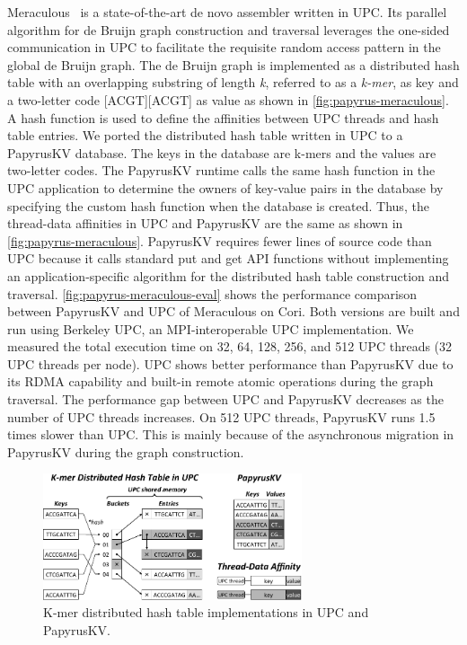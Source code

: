 Meraculous~\cite{Georganas:2014:PDB} is a state-of-the-art de novo assembler written in UPC. Its parallel algorithm for de Bruijn graph construction and traversal leverages the one-sided communication in UPC to facilitate the requisite random access pattern in the global de Bruijn graph. The de Bruijn graph is implemented as a distributed hash table with an overlapping substring of length {\it k}, referred to as a {\it k-mer}, as key and a two-letter code [ACGT][ACGT] as value as shown in \autoref{fig:papyrus-meraculous}. A hash function is used to define the affinities between UPC threads and hash table entries. We ported the distributed hash table written in UPC to a PapyrusKV database. The keys in the database are k-mers and the values are two-letter codes. The PapyrusKV runtime calls the same hash function in the UPC application to determine the owners of key-value pairs in the database by specifying the custom hash function when the database is created. Thus, the thread-data affinities in UPC and PapyrusKV are the same as shown in \autoref{fig:papyrus-meraculous}. PapyrusKV requires fewer lines of source code than UPC because it calls standard put and get API functions without implementing an application-specific algorithm for the distributed hash table construction and traversal. \autoref{fig:papyrus-meraculous-eval} shows the performance comparison between PapyrusKV and UPC of Meraculous on Cori. Both versions are built and run using Berkeley UPC, an MPI-interoperable UPC implementation. We measured the total execution time on 32, 64, 128, 256, and 512 UPC threads (32 UPC threads per node). UPC shows better performance than PapyrusKV due to its RDMA capability and built-in remote atomic operations during the graph traversal. The performance gap between UPC and PapyrusKV decreases as the number of UPC threads increases. On 512 UPC threads, PapyrusKV runs 1.5 times slower than UPC. This is mainly because of the asynchronous migration in PapyrusKV during the graph construction.

\begin{figure}[htb]
\centering
\includegraphics[width=3in]{projects/2.3.2-Tools/2.3.2.09-PROTEAS/papyrus-meraculous}
\caption{K-mer distributed hash table implementations in UPC and PapyrusKV.}
\label{fig:papyrus-meraculous}
\end{figure}

